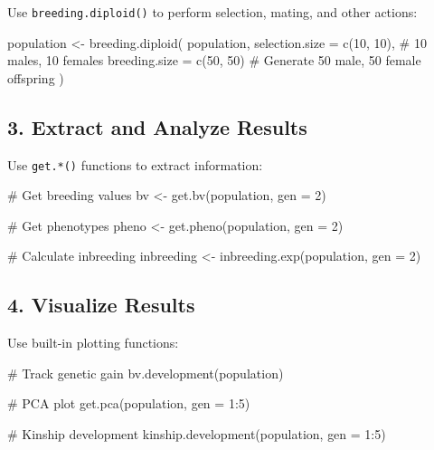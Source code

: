 \documentclass[
  letterpaper,
]{book}
\newenvironment{Shaded}{\begin{snugshade}}{\end{snugshade}}
\newcommand{\AttributeTok}[1]{\textcolor[rgb]{0.40,0.45,0.13}{#1}}
\newcommand{\CommentTok}[1]{\textcolor[rgb]{0.37,0.37,0.37}{#1}}
\newcommand{\DecValTok}[1]{\textcolor[rgb]{0.68,0.00,0.00}{#1}}
\newcommand{\FunctionTok}[1]{\textcolor[rgb]{0.28,0.35,0.67}{#1}}
\newcommand{\NormalTok}[1]{\textcolor[rgb]{0.00,0.23,0.31}{#1}}
\newcommand{\OtherTok}[1]{\textcolor[rgb]{0.00,0.23,0.31}{#1}}
\newcommand{\SpecialCharTok}[1]{\textcolor[rgb]{0.37,0.37,0.37}{#1}}
\begin{document}
Use \texttt{breeding.diploid()} to perform selection, mating, and other
actions:

\begin{Shaded}
\begin{Highlighting}[]
\NormalTok{population }\OtherTok{\textless{}{-}} \FunctionTok{breeding.diploid}\NormalTok{(}
\NormalTok{  population,}
  \AttributeTok{selection.size =} \FunctionTok{c}\NormalTok{(}\DecValTok{10}\NormalTok{, }\DecValTok{10}\NormalTok{),  }\CommentTok{\# 10 males, 10 females}
  \AttributeTok{breeding.size =} \FunctionTok{c}\NormalTok{(}\DecValTok{50}\NormalTok{, }\DecValTok{50}\NormalTok{)     }\CommentTok{\# Generate 50 male, 50 female offspring}
\NormalTok{)}
\end{Highlighting}
\end{Shaded}

\subsection{3. Extract and Analyze
Results}\label{extract-and-analyze-results}

Use \texttt{get.*()} functions to extract information:

\begin{Shaded}
\begin{Highlighting}[]
\CommentTok{\# Get breeding values}
\NormalTok{bv }\OtherTok{\textless{}{-}} \FunctionTok{get.bv}\NormalTok{(population, }\AttributeTok{gen =} \DecValTok{2}\NormalTok{)}

\CommentTok{\# Get phenotypes}
\NormalTok{pheno }\OtherTok{\textless{}{-}} \FunctionTok{get.pheno}\NormalTok{(population, }\AttributeTok{gen =} \DecValTok{2}\NormalTok{)}

\CommentTok{\# Calculate inbreeding}
\NormalTok{inbreeding }\OtherTok{\textless{}{-}} \FunctionTok{inbreeding.exp}\NormalTok{(population, }\AttributeTok{gen =} \DecValTok{2}\NormalTok{)}
\end{Highlighting}
\end{Shaded}

\subsection{4. Visualize Results}\label{visualize-results}

Use built-in plotting functions:

\begin{Shaded}
\begin{Highlighting}[]
\CommentTok{\# Track genetic gain}
\FunctionTok{bv.development}\NormalTok{(population)}

\CommentTok{\# PCA plot}
\FunctionTok{get.pca}\NormalTok{(population, }\AttributeTok{gen =} \DecValTok{1}\SpecialCharTok{:}\DecValTok{5}\NormalTok{)}

\CommentTok{\# Kinship development}
\FunctionTok{kinship.development}\NormalTok{(population, }\AttributeTok{gen =} \DecValTok{1}\SpecialCharTok{:}\DecValTok{5}\NormalTok{)}
\end{Highlighting}
\end{Shaded}
\end{document}
